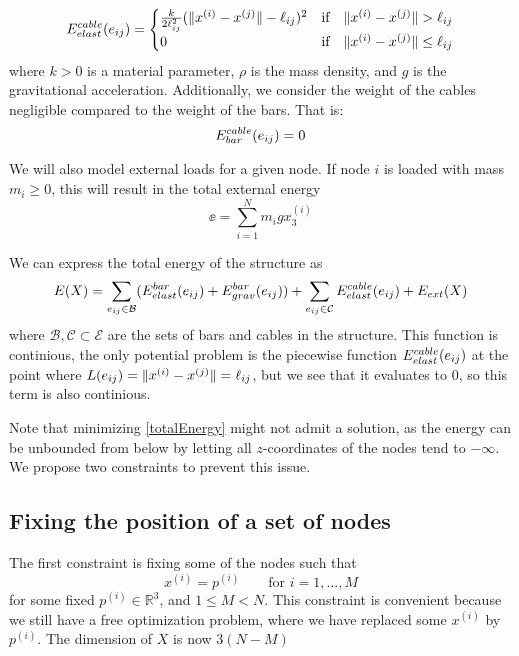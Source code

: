 \begin{equation}
E^{cable}_{elast}(e_{ij}) = \begin{cases}
    \frac{k}{2\ell_{ij}^2}(\lVert x^{(i)} - x^{(j)}\rVert-\ell_{ij})^2 & \text{if} \quad \lVert x^{(i)} - x^{(j)}\rVert >\ell_{ij}\\
    0 & \text{if} \quad \lVert x^{(i)} - x^{(j)}\rVert \leq \ell_{ij}
    \end{cases}
    \label{cableElast}
\end{equation}
where $k > 0$ is a material parameter, $\rho$ is the mass density, and $g$ is the gravitational acceleration. Additionally, we consider the weight of the cables negligible compared to the weight of the bars. That is:
\begin{equation}
    E^{cable}_{bar}(e_{ij}) = 0
    \label{cableGrav}
\end{equation}

We will also model external loads for a given node. If node $i$ is loaded with mass $m_i \geq 0$, this will result in the total external energy
\begin{equation}
    \ee = \sum_{i=1}^{N} m_i g x_3^{(i)}
    \label{externalEnergy}
\end{equation}

We can express the total energy of the structure as \begin{equation}
    E(X) = \sum\limits_{e_{ij} \in \mathcal{B}}(E^{bar}_{elast}(e_{ij}) + E^{bar}_{grav}(e_{ij})) + \sum\limits_{e_{ij} \in \mathcal{C}} E^{cable}_{elast}(e_{ij}) + E_{ext}(X)
    \label{totalEnergy}
\end{equation} where $\mathcal{B}, \mathcal{C} \subset \mathcal{E}$ are the sets of bars and cables in the structure. This function is continious, the only potential problem is the piecewise function $E^{cable}_{elast}(e_{ij})$ at the point where $L(e_{ij}) = \lVert x^{(i)} - x^{(j)}\rVert = \ell_{ij}$, but we see that it evaluates to $0$, so this term is also continious.

Note that minimizing \eqref{totalEnergy} might not admit a solution, as the energy can be unbounded from below by letting all $z$-coordinates of the nodes tend to $-\infty$. We propose two constraints to prevent this issue.

\subsection{Fixing the position of a set of nodes}
The first constraint is fixing some of the nodes such that
\begin{equation}
    x^{(i)} = p^{(i)} \qquad \text{for } i = 1,...,M
    \label{fixednode}
\end{equation} for some fixed $p^{(i)} \in \mathbb{R}^3$, and $1\leq M < N$. This constraint is convenient because we still have a free optimization problem, where we have replaced some $x^{(i)}$ by $p^{(i)}$. The dimension of $X$ is now $3(N-M)$

